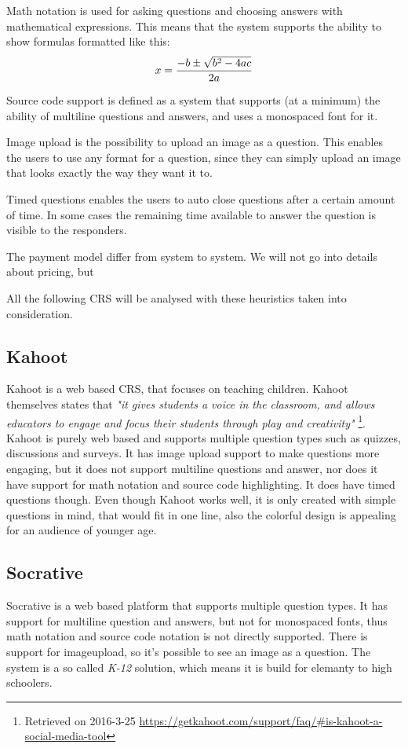 Math notation is used for asking questions and choosing answers with mathematical expressions. This means that the system supports the ability to show formulas formatted like this: $$x = {-b \pm \sqrt{b^2-4ac} \over 2a}$$

Source code support is defined as a system that supports (at a minimum) the ability of multiline questions and answers, and uses a monospaced font for it. 

Image upload is the possibility to upload an image as a question. This enables the users to use any format for a question, since they can simply upload an image that looks exactly the way they want it to.

Timed questions enables the users to auto close questions after a certain amount of time. In some cases the remaining time available to answer the question is visible to the responders.

The payment model differ from system to system. We will not go into details about pricing, but 


All the following CRS will be analysed with these heuristics taken into consideration.

\subsection{Kahoot}
Kahoot is a web based CRS, that focuses on teaching children. Kahoot themselves states that  \emph{"it gives students a voice in the classroom, and allows educators to engage and focus their students through play and creativity"} \footnote{Retrieved on 2016-3-25 \url{https://getkahoot.com/support/faq/\#is-kahoot-a-social-media-tool}}. Kahoot is purely web based and supports multiple question types such as quizzes, discussions and surveys. It has image upload support to make questions more engaging, but it does not support multiline questions and answer, nor does it have support for math notation and source code highlighting. It does have timed questions though. Even though Kahoot works well, it is only created with simple questions in mind, that would fit in one line, also the colorful design is appealing for an audience of younger age.


\subsection{Socrative}
Socrative is a web based platform that supports multiple question types. It has support for multiline question and answers, but not for monospaced fonts, thus math notation and source code notation is not directly supported. There is support for imageupload, so it's possible to see an image as a question. The system is a so called \emph{K-12} solution, which means it is build for elemanty to high schoolers.



